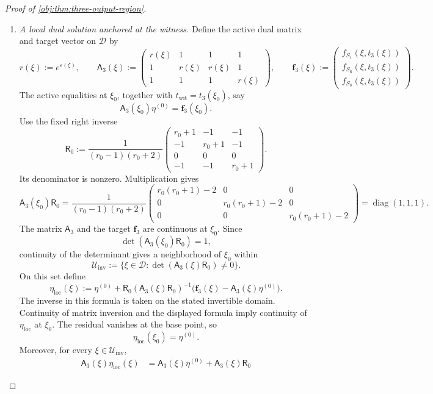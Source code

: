 \documentclass[11pt]{article}
\begin{document}
\begin{proof}[Proof of \cref{obj:thm:three-output-region}]
\begin{enumerate}
\item \textit{A local dual solution anchored at the witness.}
Define the active dual matrix and target vector on \(\mathcal D\) by
\[
r(\xi):=e^{\varepsilon(\xi)},
\qquad
\mathsf A_3(\xi):=
\begin{pmatrix}
r(\xi)&1&1&1\\
1&r(\xi)&r(\xi)&1\\
1&1&1&r(\xi)
\end{pmatrix},
\qquad
\boldsymbol f_3(\xi):=
\begin{pmatrix}
f_{S_1}(\xi,t_3(\xi))\\
f_{S_6}(\xi,t_3(\xi))\\
f_{S_8}(\xi,t_3(\xi))
\end{pmatrix}.
\]
The active equalities at \(\xi_0\), together with
\(t_{\mathrm{wit}}=t_3(\xi_0)\), say
\[
\mathsf A_3(\xi_0)\eta^{(0)}=\boldsymbol f_3(\xi_0).
\]
Use the fixed right inverse
\[
\mathsf R_0:=
\frac{1}{(r_0-1)(r_0+2)}
\begin{pmatrix}
r_0+1&-1&-1\\
-1&r_0+1&-1\\
0&0&0\\
-1&-1&r_0+1
\end{pmatrix}.
\]
Its denominator is nonzero. Multiplication gives
\[
\mathsf A_3(\xi_0)\mathsf R_0
=
\frac{1}{(r_0-1)(r_0+2)}
\begin{pmatrix}
r_0(r_0+1)-2&0&0\\
0&r_0(r_0+1)-2&0\\
0&0&r_0(r_0+1)-2
\end{pmatrix}
=\operatorname{diag}(1,1,1).
\]
The matrix \(\mathsf A_3\) and the target \(\boldsymbol f_3\) are continuous at \(\xi_0\). Since
\[
\det(\mathsf A_3(\xi_0)\mathsf R_0)=1,
\]
continuity of the determinant gives a neighborhood of \(\xi_0\) within
\[
\mathcal U_{\mathrm{inv}}
:=
\{\xi\in\mathcal D:
\det(\mathsf A_3(\xi)\mathsf R_0)\ne0\}.
\]
On this set define
\[
\eta_{\mathrm{loc}}(\xi):=
\eta^{(0)}
+
\mathsf R_0
(\mathsf A_3(\xi)\mathsf R_0)^{-1}
\bigl(\boldsymbol f_3(\xi)-\mathsf A_3(\xi)\eta^{(0)}\bigr).
\]
The inverse in this formula is taken on the stated invertible domain. Continuity of matrix inversion and the displayed formula imply continuity of \(\eta_{\mathrm{loc}}\) at \(\xi_0\). The residual vanishes at the base point, so
\[
\eta_{\mathrm{loc}}(\xi_0)=\eta^{(0)}.
\]
Moreover, for every \(\xi\in\mathcal U_{\mathrm{inv}}\),
\[
\begin{aligned}
\mathsf A_3(\xi)\eta_{\mathrm{loc}}(\xi)
&=
\mathsf A_3(\xi)\eta^{(0)}
+
\mathsf A_3(\xi)\mathsf R_0

\end{aligned}\]
\end{enumerate}
\end{proof}
\end{document}
